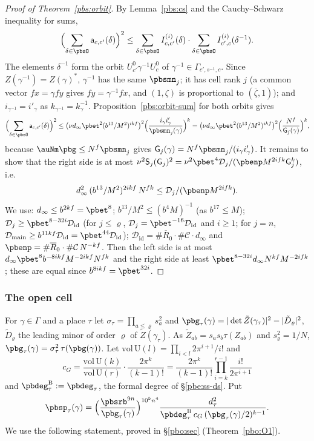 \documentclass[10pt]{amsart}
\theoremstyle{definition}
\theoremstyle{remark}
\providecommand{\auU}{\mathrm U}
\providecommand{\aubar}[1]{\overline{#1}}
\providecommand{\pbDid}{\mathcal D_{\mathrm{id}}}
\providecommand{\pbDmain}{\mathcal D_{\mathrm{main}}}
\providecommand{\pbR}{\overline R_0}
\begin{document}
\begin{proof}[Proof of Theorem~\ref{pbs:orbit}]
By Lemma~\ref{pbs:cs} and the Cauchy--Schwarz inequality for sums,
\[
\Bigl(\sum_{\delta\in\pbsO}\mathsf a_{c,c'}(\delta)\Bigr)^2\le\sum_{\delta\in\pbsO}I^{(i)}_{c,c'}(\delta)\cdot
\sum_{\delta\in\pbsO}I^{(i)}_{c',c}(\delta^{-1}).
\]
The elements $\delta^{-1}$ form the orbit $U^0_{c'}\gamma^{-1}U^0_c$ of $\gamma^{-1}\in\Gamma_{c',s^{-1},c}$.
Since $Z(\gamma^{-1})=Z(\gamma)^*$, $\gamma^{-1}$ has the same $\pbsmn_j$; it has cell rank $j$ (a common
vector $fx=\gamma fy$ gives $fy=\gamma^{-1}fx$, and $(1,\zeta)$ is proportional to $(\aubar\zeta,1)$); and
$i_{\gamma^{-1}}=i'_\gamma$ as $k_{\gamma^{-1}}=k_\gamma^{-1}$. Proposition~\ref{pbs:orbit-sum} for both orbits
gives
\[
\Bigl(\sum_{\delta\in\pbsO}\mathsf a_{c,c'}(\delta)\Bigr)^2\le\bigl(\nu d_\infty\pbet^2(b^{13}/M^2)^{ikf}
\bigr)^2\Bigl(\frac{i_\gamma i'_\gamma}{\pbsmn_j(\gamma)}\Bigr)^k=\bigl(\nu d_\infty\pbet^2(b^{13}/M^2)^{ikf}
\bigr)^2\Bigl(\frac{N^f}{\mathsf G_j(\gamma)}\Bigr)^k,
\]
because $\auNm\pbg\le N^f\pbsmn_j$ gives $\mathsf G_j(\gamma)=N^f\pbsmn_j/(i_\gamma i'_\gamma)$. It remains to
show that the right side is at most $\nu^2\mathsf S_j(\mathsf G_j)^2=\nu^2\pbet^4\mathcal D_j/(\pbenp M^{2ifk}
\mathsf G_j^k)$, i.e.
\[
d_\infty^2\,(b^{13}/M^2)^{2ikf}\,N^{fk}\le\mathcal D_j/(\pbenp M^{2ifk}).
\]
We use: $d_\infty\le b^{2kf}=\pbet^8$; $b^{13}/M^2\le(b^4M)^{-1}$ (as $b^{17}\le M$); $\mathcal D_j\ge\pbet^{8-
32i}\pbDid$ (for $j\le\varrho$, $\mathcal D_j=\pbet^{-16}\pbDid$ and $i\ge1$; for $j=n$, $\pbDmain\ge b^{11kf}
\pbDid=\pbet^{44}\pbDid$); $\pbDid=\#\pbR\cdot\#\mathcal C\cdot d_\infty$ and $\pbenp=\#\pbR\cdot\#\mathcal C\,
N^{-kf}$. Then the left side is at most $d_\infty\pbet^8b^{-8ikf}M^{-2ikf}N^{fk}$ and the right side at
least $\pbet^{8-32i}d_\infty N^{kf}M^{-2ifk}$; these are equal since $b^{8ikf}=\pbet^{32i}$.
\end{proof}

\subsubsection{The open cell}\label{pbs:ss-open}

For $\gamma\in\Gamma$ and a place $\tau$ let $\sigma_\tau=\prod_{a\le\varrho}s_a^2$ and $\pbg_\tau(\gamma)=
|\det\tilde Z(\gamma_\tau)|^2-|\tilde D_\varrho|^2$, $\tilde D_\varrho$ the leading minor of order $\varrho$ of
$\tilde Z(\gamma_\tau)$. As $\tilde Z_{ab}=s_as_b\tau(Z_{ab})$ and $s_\varrho^2=1/N$, $\pbg_\tau(\gamma)=\sigma_
\tau^2\,\tau(\pbg(\gamma))$. Let $\mathrm{vol}\,\auU(l)=\prod_{i<l}2\pi^{i+1}/i!$ and
\[
c_G=\frac{\mathrm{vol}\,\auU(k)}{\mathrm{vol}\,\auU(r)}\cdot\frac{2\pi^k}{(k-1)!}=\frac{2\pi^k}{(k-1)!}
\prod_{i=k}^{r-1}\frac{i!}{2\pi^{i+1}}
\]
and $\pbdeg^{\mathrm B}_\tau:=\pbdeg_\tau$, the formal
degree of \S\ref{pbe:ss-ds}. Put
\[
\pbsp_\tau(\gamma)=\Bigl(\frac{\pbsrb^{9n}}{\pbg_\tau(\gamma)}\Bigr)^{10^5n^4}\frac{d_\tau^2}{\pbdeg^{
\mathrm B}_\tau\,c_G\,(\pbg_\tau(\gamma)/2)^{k-1}} .
\]
We use the following statement, proved in \S\ref{pbo:sec} (Theorem~\ref{pbo:O1}).
\end{document}
